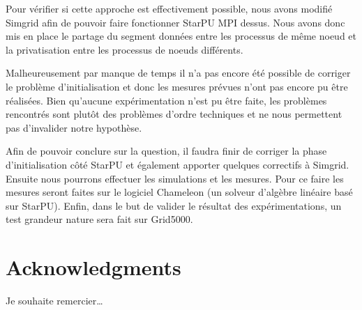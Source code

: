 \documentclass[smallextended]{svjour3}
\begin{document}
Pour vérifier si cette approche est effectivement possible, nous
avons modifié Simgrid afin de pouvoir faire fonctionner StarPU MPI
dessus. Nous avons donc mis en place le partage du segment données
entre les processus de même noeud et la privatisation entre les
processus de noeuds différents. 

Malheureusement par manque de temps il n'a pas encore été possible
de corriger le problème d'initialisation et donc les mesures prévues
n'ont pas encore pu être réalisées. Bien qu'aucune expérimentation
n'est pu être faite, les problèmes rencontrés sont plutôt des
problèmes d'ordre techniques et ne nous permettent pas d'invalider
notre hypothèse. 

Afin de pouvoir conclure sur la question, il faudra finir de
corriger la phase d'initialisation côté StarPU et également apporter
quelques correctifs à Simgrid. Ensuite nous pourrons effectuer les
simulations et les mesures. Pour ce faire les mesures seront faites
sur le logiciel Chameleon (un solveur d'algèbre linéaire basé sur
StarPU). Enfin, dans le but de valider le résultat des
expérimentations, un test grandeur nature sera fait sur Grid5000.


\section*{Acknowledgments}
Je souhaite remercier\ldots{}

\nocite{*}
\def\raggedright{}


\end{document}
